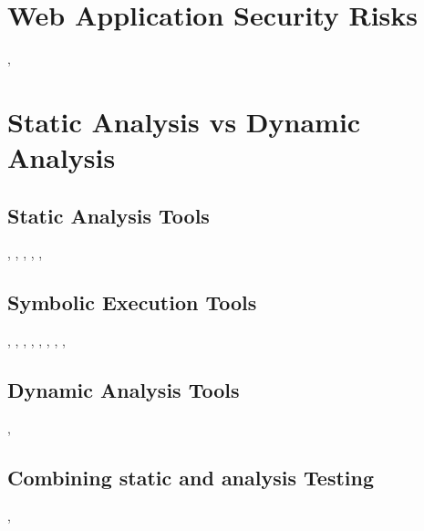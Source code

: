 \section{Web Application Security Risks}
\autocite[]{ElIdrissi2017}, \autocite[]{Li2014}
\section{Static Analysis vs Dynamic Analysis}
\subsection{Static Analysis Tools}
\autocite[]{Chaudhuri2010}, \autocite[]{Near2014}, \autocite[]{Bocic2014}, \autocite[]{Munetoh2013a}, \autocite[]{Jovanovic2006}, \autocite[]{Munetoh2013}
\subsection{Symbolic Execution Tools}
\autocite[]{Chaudhuri2010}, \autocite[]{Near2014}, \autocite[]{Near2012}, \autocite[]{Nijjar2011}, \autocite[]{Near2016}, \autocite[]{Jackson2002}, \autocite[]{Bocic2016}, \autocite[]{Cadar2011}, \autocite[]{Bocic2014}
\subsection{Dynamic Analysis Tools}
\autocite[]{Yip2009}, \autocite[]{Felt2011}
\subsection{Combining static and analysis Testing}
\autocite[]{Lam2008}, \autocite[]{Hosek2011} \autocite[]{Araujo2018} 



